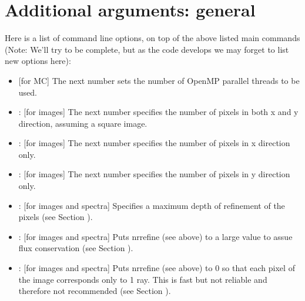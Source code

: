 \documentclass[letterpaper,10pt,english]{sphinxmanual}
\begin{document}
\section{Additional arguments: general}
\label{\detokenize{clioptions:additional-arguments-general}}
Here is a list of command line options, on top of the above listed main
commands (Note: We’ll try to be complete, but as the code develops we may
forget to list new options here):
\begin{itemize}
\item {} 
 {[}for MC{]} The next number sets the number of OpenMP parallel threads
to be used.

\item {} 
: {[}for images{]} The next number specifies the number of
pixels in both x and y direction, assuming a square image.

\item {} 
: {[}for images{]} The next number specifies the number of
pixels in x direction only.

\item {} 
: {[}for images{]} The next number specifies the number of
pixels in y direction only.

\item {} 
: {[}for images and spectra{]} Specifies a maximum depth of
refinement of the pixels (see Section {\hyperref[\detokenize{imagesspectra:sec-image-refinement}]{}}).

\item {} 
: {[}for images and spectra{]} Puts nrrefine (see above) to
a large value to assue flux conservation (see Section {\hyperref[\detokenize{imagesspectra:sec-image-refinement}]{}}).

\item {} 
: {[}for images and spectra{]} Puts
nrrefine (see above) to 0 so that each pixel of the image corresponds only
to 1 ray. This is fast but not reliable and therefore not recommended (see
Section {\hyperref[\detokenize{imagesspectra:sec-image-refinement}]{}}).


\end{itemize}
\end{document}
